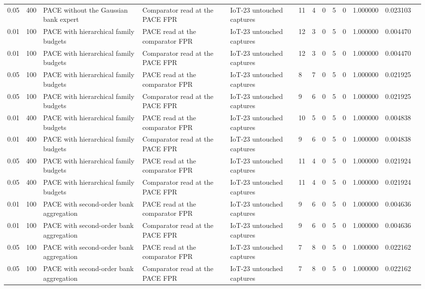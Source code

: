 \begin{tabular}{lllllllllllll}
0.05 & 400 & PACE without the Gaussian bank expert & Comparator read at the PACE FPR & IoT-23 untouched captures & 11 & 4 & 0 & 5 & 0 & 1.000000 & 0.023103 &  \\
0.01 & 100 & PACE with hierarchical family budgets & PACE read at the comparator FPR & IoT-23 untouched captures & 12 & 3 & 0 & 5 & 0 & 1.000000 & 0.004470 &  \\
0.01 & 100 & PACE with hierarchical family budgets & Comparator read at the PACE FPR & IoT-23 untouched captures & 12 & 3 & 0 & 5 & 0 & 1.000000 & 0.004470 &  \\
0.05 & 100 & PACE with hierarchical family budgets & PACE read at the comparator FPR & IoT-23 untouched captures & 8 & 7 & 0 & 5 & 0 & 1.000000 & 0.021925 &  \\
0.05 & 100 & PACE with hierarchical family budgets & Comparator read at the PACE FPR & IoT-23 untouched captures & 9 & 6 & 0 & 5 & 0 & 1.000000 & 0.021925 &  \\
0.01 & 400 & PACE with hierarchical family budgets & PACE read at the comparator FPR & IoT-23 untouched captures & 10 & 5 & 0 & 5 & 0 & 1.000000 & 0.004838 &  \\
0.01 & 400 & PACE with hierarchical family budgets & Comparator read at the PACE FPR & IoT-23 untouched captures & 9 & 6 & 0 & 5 & 0 & 1.000000 & 0.004838 &  \\
0.05 & 400 & PACE with hierarchical family budgets & PACE read at the comparator FPR & IoT-23 untouched captures & 11 & 4 & 0 & 5 & 0 & 1.000000 & 0.021924 &  \\
0.05 & 400 & PACE with hierarchical family budgets & Comparator read at the PACE FPR & IoT-23 untouched captures & 11 & 4 & 0 & 5 & 0 & 1.000000 & 0.021924 &  \\
0.01 & 100 & PACE with second-order bank aggregation & PACE read at the comparator FPR & IoT-23 untouched captures & 9 & 6 & 0 & 5 & 0 & 1.000000 & 0.004636 &  \\
0.01 & 100 & PACE with second-order bank aggregation & Comparator read at the PACE FPR & IoT-23 untouched captures & 9 & 6 & 0 & 5 & 0 & 1.000000 & 0.004636 &  \\
0.05 & 100 & PACE with second-order bank aggregation & PACE read at the comparator FPR & IoT-23 untouched captures & 7 & 8 & 0 & 5 & 0 & 1.000000 & 0.022162 &  \\
0.05 & 100 & PACE with second-order bank aggregation & Comparator read at the PACE FPR & IoT-23 untouched captures & 7 & 8 & 0 & 5 & 0 & 1.000000 & 0.022162 &  \\

\end{tabular}
